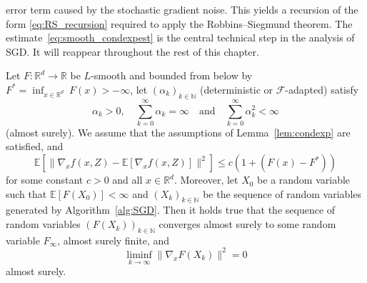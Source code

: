 \documentclass[12pt,openany]{book}
\theoremstyle{definition}
\theoremstyle{definition}
\newcommand{\E}{\mathbb{E}}
\newcommand{\N}{\mathbb{N}}
\newcommand{\R}{\mathbb{R}}
\begin{document}
error term caused by the stochastic gradient noise. This yields a recursion of the form
\eqref{eq:RS_recursion} required to apply the Robbins--Siegmund theorem. The estimate~\eqref{eq:smooth_condexpest} is the central technical step in the analysis of SGD. It will reappear throughout the rest of this chapter.
\begin{thm}\label{thm:SGD_as}
Let $F:\R^d\to\R$ be $L$-smooth and bounded from below by $F^\ast = \inf_{x\in\R^d}\ F(x)>-\infty$, let $(\alpha_k)_{k\in\N}$ (deterministic or $\mathcal F$-adapted) satisfy 
\[\alpha_k>0,\quad \sum_{k=0}^\infty \alpha_k =\infty\quad \text{and}\quad \sum_{k=0}^\infty \alpha_k^2<\infty \]
(almost surely). We assume that the assumptions of Lemma~\ref{lem:condexp} are satisfied, and 
\[\E[\|\nabla_x f(x,Z)-\E[\nabla_x f(x,Z)]\|^2] \le c(1+(F(x)-F^\ast)) \] 
for some constant $c>0$ and all $x\in\R^d$. Moreover, let $X_0$ be a random variable such that $\E[F(X_0)]<\infty$ and $(X_k)_{k\in\N}$ be the sequence of random variables generated by Algorithm~\ref{alg:SGD}. Then it holds true that the sequence of random variables $(F(X_k))_{k\in\N}$ converges almost surely to some random variable $F_\infty$, almost surely finite, and 
\[\liminf_{k\to\infty} \|\nabla_x F(X_k)\|^2 = 0 \]
almost surely.
\end{thm}
\end{document}
